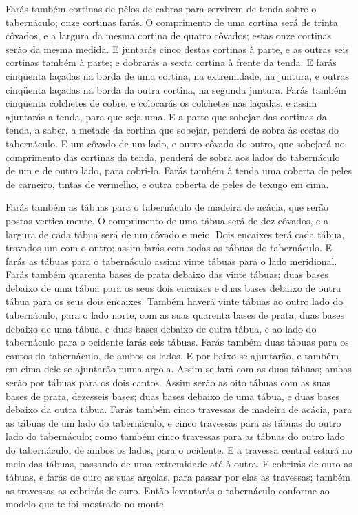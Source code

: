 Farás também cortinas de pêlos de cabras para servirem de tenda
sobre o tabernáculo; onze cortinas farás. O comprimento de uma
cortina será de trinta côvados, e a largura da mesma cortina de
quatro côvados; estas onze cortinas serão da mesma medida. E
juntarás cinco destas cortinas à parte, e as outras seis cortinas
também à parte; e dobrarás a sexta cortina à frente da tenda.
E farás cinqüenta laçadas na borda de uma cortina, na
extremidade, na juntura, e outras cinqüenta laçadas na borda da
outra cortina, na segunda juntura. Farás também cinqüenta
colchetes de cobre, e colocarás os colchetes nas laçadas, e assim
ajuntarás a tenda, para que seja uma. E a parte que sobejar
das cortinas da tenda, a saber, a metade da cortina que sobejar,
penderá de sobra às costas do tabernáculo. E um côvado de um
lado, e outro côvado do outro, que sobejará no comprimento das
cortinas da tenda, penderá de sobra aos lados do tabernáculo de um e
de outro lado, para cobri-lo. Farás também à tenda uma
coberta de peles de carneiro, tintas de vermelho, e outra coberta de
peles de texugo em cima.

Farás também as tábuas para o tabernáculo de madeira de acácia,
que serão postas verticalmente. O comprimento de uma tábua
será de dez côvados, e a largura de cada tábua será de um côvado e
meio. Dois encaixes terá cada tábua, travados um com o outro;
assim farás com todas as tábuas do tabernáculo. E farás as
tábuas para o tabernáculo assim: vinte tábuas para o lado
meridional. Farás também quarenta bases de prata debaixo das
vinte tábuas; duas bases debaixo de uma tábua para os seus dois
encaixes e duas bases debaixo de outra tábua para os seus dois
encaixes. Também haverá vinte tábuas ao outro lado do
tabernáculo, para o lado norte, com as suas quarenta bases de
prata; duas bases debaixo de uma tábua, e duas bases debaixo de
outra tábua, e ao lado do tabernáculo para o ocidente farás
seis tábuas. Farás também duas tábuas para os cantos do
tabernáculo, de ambos os lados. E por baixo se ajuntarão, e
também em cima dele se ajuntarão numa argola. Assim se fará com as
duas tábuas; ambas serão por tábuas para os dois cantos.
Assim serão as oito tábuas com as suas bases de prata,
dezesseis bases; duas bases debaixo de uma tábua, e duas bases
debaixo da outra tábua. Farás também cinco travessas de
madeira de acácia, para as tábuas de um lado do tabernáculo,
e cinco travessas para as tábuas do outro lado do
tabernáculo; como também cinco travessas para as tábuas do outro
lado do tabernáculo, de ambos os lados, para o ocidente. E a
travessa central estará no meio das tábuas, passando de uma
extremidade até à outra. E cobrirás de ouro as tábuas, e
farás de ouro as suas argolas, para passar por elas as travessas;
também as travessas as cobrirás de ouro. Então levantarás o
tabernáculo conforme ao modelo que te foi mostrado no monte.

